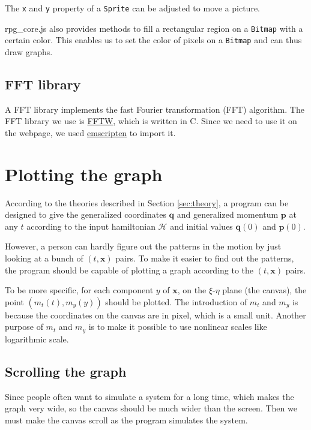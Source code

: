\documentclass[12pt]{article}
\begin{document}
The \verb!x! and \verb!y! property of a \verb!Sprite! can be adjusted to move a picture.

rpg\_core.js also provides methods to fill a rectangular region on a \verb!Bitmap!
with a certain color.
This enables us to set the color of pixels on a \verb!Bitmap! and can thus draw graphs.

\subsection{FFT library}
\label{sec:fft}

A FFT library implements the fast Fourier transformation (FFT) algorithm.
The FFT library we use is \href{http://www.fftw.org}{FFTW}, which is written in C.
Since we need to use it on the webpage,
we used \href{https://emscripten.org}{emscripten} to import it.

\section{Plotting the graph}

According to the theories described in Section \ref{sec:theory},
a program can be designed to give
the generalized coordinates $\mathbf q$ and generalized momentum $\mathbf p$ at any $t$
according to the input hamiltonian $\mathcal H$
and initial values $\mathbf q\left(0\right)$ and $\mathbf p\left(0\right)$.

However, a person can hardly figure out the patterns in the motion
by just looking at a bunch of $\left(t,\mathbf x\right)$ pairs.
To make it easier to find out the patterns,
the program should be capable of plotting a graph
according to the $\left(t,\mathbf x\right)$ pairs.

To be more specific, for each component $y$ of $\mathbf x$,
on the $\xi$-$\eta$ plane (the canvas),
the point $\left(m_t\left(t\right),m_y\left(y\right)\right)$ should be plotted.
The introduction of $m_t$ and $m_y$ is because the coordinates on the canvas
are in pixel, which is a small unit.
Another purpose of $m_t$ and $m_y$ is to make it possible to use nonlinear
scales like logarithmic scale.

\subsection{Scrolling the graph}

Since people often want to simulate a system for a long time,
which makes the graph very wide,
so the canvas should be much wider than the screen.
Then we must make the canvas scroll as the program simulates the system.
\end{document}
